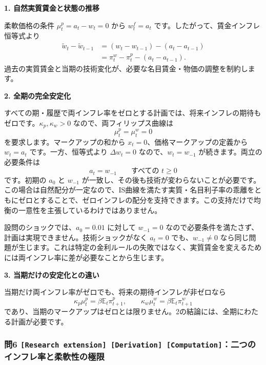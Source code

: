 \documentclass[
  japanese,
  lualatex,
  ja=standard,
  11pt,
  a4paper]{ltjsarticle}
\begin{document}
\textbf{1. 自然実質賃金と状態の推移}

柔軟価格の条件 \(\mu_t^p=a_t-w_t=0\) から \(w_t^f=a_t\)
です。したがって、賃金インフレ恒等式より \[
\begin{aligned}
\widetilde w_t-\widetilde w_{t-1}
&=(w_t-w_{t-1})-(a_t-a_{t-1})\\
&=\pi_t^w-\pi_t^p-(a_t-a_{t-1}).
\end{aligned}
\]
過去の実質賃金と当期の技術変化が、必要な名目賃金・物価の調整を制約します。

\textbf{2. 全期の完全安定化}

すべての期・履歴で両インフレ率をゼロとする計画では、将来インフレの期待もゼロです。\(\kappa_p,\kappa_w>0\)
なので、両フィリップス曲線は \[
\mu_t^p=\mu_t^w=0
\] を要求します。マークアップの和から
\(x_t=0\)、価格マークアップの定義から \(w_t=a_t\) です。一方、恒等式より
\(\Delta w_t=0\) なので、\(w_t=w_{-1}\) が続きます。両立の必要条件は \[
a_t=w_{-1}\qquad\text{すべての }t\geq0
\] です。初期の \(a_0\) と \(w_{-1}\)
が一致し、その後も技術が変わらないことが必要です。この場合は自然配分が一定なので、IS曲線を満たす実質・名目利子率の乖離をともにゼロとすることで、ゼロインフレの配分を支持できます。この支持だけで均衡の一意性を主張しているわけではありません。

設問のショックでは、\(a_0=0.01\) に対して \(w_{-1}=0\)
なので必要条件を満たさず、計画は実現できません。技術ショックがなく
\(a_t=0\) でも、\(w_{-1}\ne0\)
なら同じ問題が生じます。これは特定の金利ルールの失敗ではなく、実質賃金を変えるためには両インフレ率に差が必要なことから生じます。

\textbf{3. 当期だけの安定化との違い}

当期だけ両インフレ率がゼロでも、将来の期待インフレが非ゼロなら \[
\kappa_p\mu_t^p=\beta\mathbb E_t\pi_{t+1}^p,
\qquad
\kappa_w\mu_t^w=\beta\mathbb E_t\pi_{t+1}^w
\]
であり、当期のマークアップはゼロとは限りません。2の結論には、全期にわたる計画が必要です。


\subsubsection{\texorpdfstring{問6
\texttt{{[}Research\ extension{]}\ {[}Derivation{]}\ {[}Computation{]}}：二つのインフレ率と柔軟性の極限}{問6 {[}Research extension{]} {[}Derivation{]} {[}Computation{]}：二つのインフレ率と柔軟性の極限}}\label{ux554f6-research-extension-derivation-computationux4e8cux3064ux306eux30a4ux30f3ux30d5ux30ecux7387ux3068ux67d4ux8edfux6027ux306eux6975ux9650}
\end{document}
